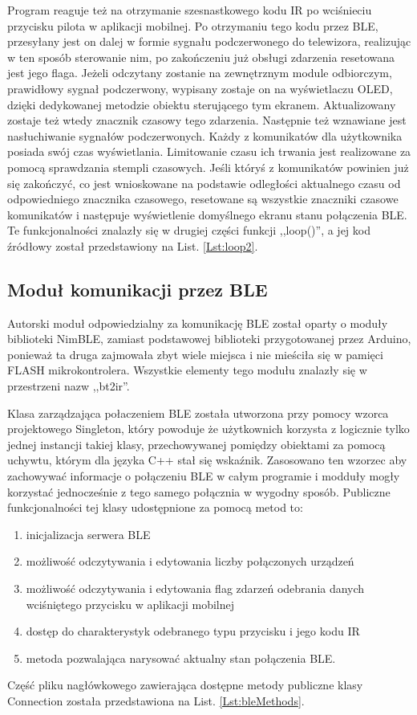 \documentclass[12pt,twoside]{article}
\begin{document}
Program reaguje też na otrzymanie szesnastkowego kodu IR po wciśnieciu przycisku  pilota w aplikacji mobilnej. Po otrzymaniu tego kodu przez BLE, przesyłany jest on dalej w formie sygnału podczerwonego do telewizora, realizując w ten sposób sterowanie nim, po zakończeniu już obsługi zdarzenia resetowana jest jego flaga. Jeżeli odczytany zostanie na zewnętrznym module odbiorczym, prawidłowy sygnał podczerwony, wypisany zostaje on na wyświetlaczu OLED, dzięki dedykowanej metodzie obiektu sterującego tym ekranem. Aktualizowany zostaje też wtedy znacznik czasowy tego zdarzenia. Następnie też wznawiane jest nasłuchiwanie sygnałów podczerwonych. Każdy z komunikatów dla użytkownika posiada swój czas wyświetlania. Limitowanie czasu ich trwania jest realizowane za pomocą sprawdzania stempli czasowych. Jeśli któryś z komunikatów powinien już się zakończyć, co jest wnioskowane na podstawie odległości aktualnego czasu od odpowiedniego znacznika czasowego, resetowane są wszystkie znaczniki czasowe komunikatów i następuje wyświetlenie domyślnego ekranu stanu połączenia BLE. Te funkcjonalności znalazły się w drugiej części funkcji ,,loop()'', a jej kod źródłowy został przedstawiony na List. \ref{Lst:loop2}.

\subsection{Moduł komunikacji przez BLE}
Autorski moduł odpowiedzialny za komunikację BLE został oparty o moduły biblioteki NimBLE\cite{nimBLE}, zamiast podstawowej biblioteki przygotowanej przez Arduino, ponieważ ta druga zajmowała zbyt wiele miejsca i nie mieściła się w pamięci FLASH mikrokontrolera. Wszystkie elementy tego modułu znalazły się w przestrzeni nazw ,,bt2ir''.

Klasa zarządzająca połaczeniem BLE została utworzona przy pomocy wzorca projektowego Singleton\cite{designPatterns}, który powoduje że użytkownich korzysta z logicznie tylko jednej instancji takiej klasy, przechowywanej pomiędzy obiektami za pomocą uchywtu, którym dla języka C++ stał się wskaźnik. Zasosowano ten wzorzec aby zachowywać informacje o połączeniu BLE w całym programie i modduły mogły korzystać jednocześnie z tego samego połącznia w wygodny sposób. Publiczne funkcjonalności tej klasy udostępnione za pomocą metod to:
\begin{enumerate}[label=\alph*), leftmargin=1.25cm]
   \item inicjalizacja serwera BLE
   \item możliwość odczytywania i edytowania liczby połączonych urządzeń
   \item możliwość odczytywania i edytowania flag zdarzeń odebrania danych wciśniętego przycisku w aplikacji mobilnej
   \item dostęp do charakterystyk odebranego typu przycisku i jego kodu IR
   \item metoda pozwalająca narysować aktualny stan połączenia BLE.
\end{enumerate} Część pliku nagłówkowego zawierająca dostępne metody publiczne klasy Connection została przedstawiona na List. \ref*{Lst:bleMethods}.
\end{document}
